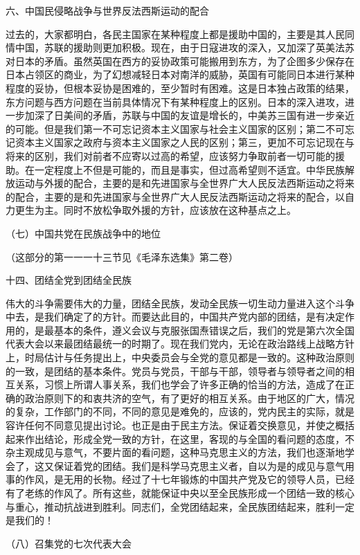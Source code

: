 六、中国民侵略战争与世界反法西斯运动的配合

过去的，大家都明白，各民主国家在某种程度上都是援助中国的，主要是其人民同情中国，苏联的援助则更加积极。现在，由于日寇进攻的深入，又加深了英美法苏对日本的矛盾。虽然英国在西方的妥协政策可能搬用到东方，为了企图多少保存在日本占领区的商业，为了幻想减轻日本对南洋的威胁，英国有可能同日本进行某种程度的妥协，但根本妥协是困难的，至少暂时有困难。这是日本独占政策的结果，东方问题与西方问题在当前具体情况下有某种程度上的区别。日本的深入进攻，进一步加深了日美间的矛盾，苏联与中国的友谊是增长的，中美苏三国有进一步亲近的可能。但是我们第一不可忘记资本主义国家与社会主义国家的区别；第二不可忘记资本主义国家之政府与资本主义国家之人民的区别；第三，更加不可忘记现在与将来的区别，我们对前者不应寄以过高的希望，应该努力争取前者一切可能的援助。在一定程度上不但是可能的，而且是事实，但过高希望则不适宜。中华民族解放运动与外援的配合，主要的是和先进国家与全世界广大人民反法西斯运动之将来的配合，主要的是和先进国家与全世界广大人民反法西斯运动之将来的配合，以自力更生为主。同时不放松争取外援的方针，应该放在这种基点之上。

（七）中国共党在民族战争中的地位

（这部分的第一一一十三节见《毛泽东选集》第二卷）

十四、团结全党到团结全民族

伟大的斗争需要伟大的力量，团结全民族，发动全民族一切生动力量进入这个斗争中去，是我们确定了的方针。而要达此目的，中国共产党内部的团结，是有决定作用的，是最基本的条件，遵义会议与克服张国焘错误之后，我们的党是第六次全国代表大会以来最团结最统一的时期了。现在我们党内，无论在政治路线上战略方针上，时局估计与任务提出上，中央委员会与全党的意见都是一致的。这种政治原则的一致，是团结的基本条件。党员与党员，干部与干部，领导者与领导者之间的相互关系，习惯上所谓人事关系，我们也学会了许多正确的恰当的方法，造成了在正确的政治原则下的和衷共济的空气，有了更好的相互关系。由于地区的广大，情况的复杂，工作部门的不同，不同的意见是难免的，应该的，党内民主的实际，就是容许任何不同意见提出讨论。也正是由于民主方法。保证着交换意见，并使之概括起来作出结论，形成全党一致的方针，在这里，客现的与全国的看问题的态度，不杂主观成见与意气，不要片面的看问题，这种马克思主义的方法，我们也逐渐地学会了，这又保证着党的团结。我们是科学马克思主义者，自以为是的成见与意气用事的作风，是无用的长物。经过了十七年锻炼的中国共产党及它的领导人员，已经有了老练的作风了。所有这些，就能保证中央以至全民族形成一个团结一致的核心与重心，推动抗战进到胜利。同志们，全党团结起来，全民族团结起来，胜利一定是我们的！

（八）召集党的七次代表大会

